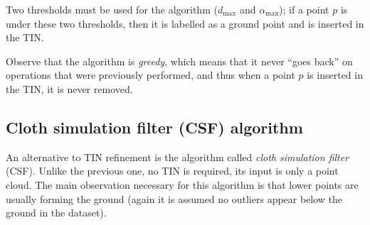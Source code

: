 %

Two thresholds must be used for the algorithm ($d_{\max}$ and $\alpha_{\max}$); if a point $p$ is under these two thresholds, then it is labelled as a ground point and is inserted in the TIN\@.

Observe that the algorithm is \emph{greedy}, which means that it never ``goes back'' on operations that were previously performed, and thus when a point $p$ is inserted in the TIN, it is never removed.

%



%
\subsection{Cloth simulation filter (CSF) algorithm}

An alternative to TIN refinement is the algorithm called \emph{cloth simulation filter} (CSF).
Unlike the previous one, no TIN is required, its input is only a point cloud.
The main observation necessary for this algorithm is that lower points are usually forming the ground (again it is assumed no outliers appear below the ground in the dataset).

%

